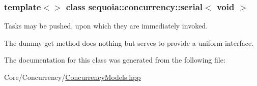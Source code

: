 \subsubsection*{template$<$$>$\newline
class sequoia\+::concurrency\+::serial$<$ void $>$}

Tasks may be pushed, upon which they are immediately invoked. 

The dummy get method does nothing but serves to provide a uniform interface. 

The documentation for this class was generated from the following file\+:\begin{DoxyCompactItemize}
\item 
Core/\+Concurrency/\mbox{\hyperlink{_concurrency_models_8hpp}{Concurrency\+Models.\+hpp}}\end{DoxyCompactItemize}
